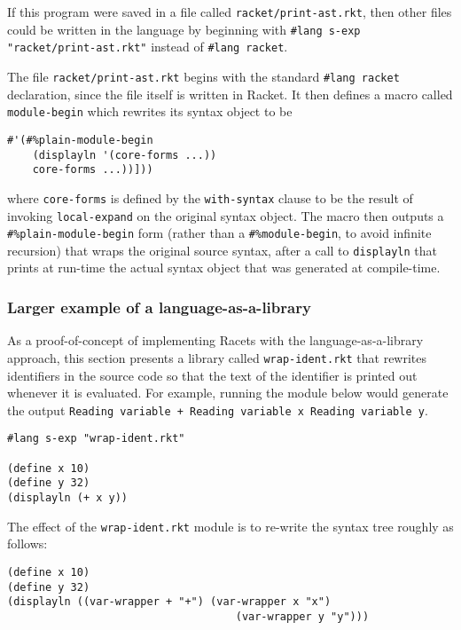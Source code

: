 \documentclass{article}
\begin{document}
If this program were saved in a file called \texttt{racket/print-ast.rkt}, then other files could be written in the language by beginning with \texttt{\#lang s-exp "racket/print-ast.rkt"} instead of \texttt{\#lang racket}.

The file \texttt{racket/print-ast.rkt} begins with the standard \texttt{\#lang racket} declaration, since the file itself is written in Racket. It then defines a macro called \texttt{module-begin} which rewrites its syntax object to be

\begin{lstlisting}
#'(#%plain-module-begin
    (displayln '(core-forms ...))
    core-forms ...))]))
\end{lstlisting}

where \texttt{core-forms} is defined by the \texttt{with-syntax} clause to be the result of invoking \texttt{local-expand} on the original syntax object. The macro then outputs a \texttt{\#\%plain-module-begin} form (rather than a \texttt{\#\%module-begin}, to avoid infinite recursion) that wraps the original source syntax, after a call to \texttt{displayln} that prints at run-time the actual syntax object that was generated at compile-time.


\subsubsection{Larger example of a language-as-a-library}
As a proof-of-concept of implementing Racets with the language-as-a-library approach, this section presents a library called \texttt{wrap-ident.rkt} that rewrites identifiers in the source code so that the text of the identifier is printed out whenever it is evaluated. For example, running the module below would generate the output \texttt{Reading variable +  Reading variable x  Reading variable y}.

\begin{lstlisting}
#lang s-exp "wrap-ident.rkt"

(define x 10)
(define y 32)
(displayln (+ x y))
\end{lstlisting}

The effect of the \texttt{wrap-ident.rkt} module is to re-write the syntax tree roughly as follows:

\begin{lstlisting}
(define x 10)
(define y 32)
(displayln ((var-wrapper + "+") (var-wrapper x "x")
                                    (var-wrapper y "y")))
\end{lstlisting}
\end{document}
